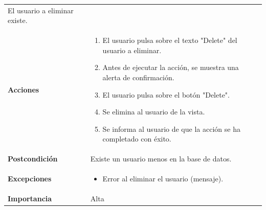 \documentclass[
]{article}
\providecommand{\tightlist}{%
  \setlength{\itemsep}{0pt}\setlength{\parskip}{0pt}}
\begin{document}
\begin{longtable}[]{@{}ll@{}}
\begin{minipage}[t]{0.68\columnwidth}
El usuario a eliminar existe.\strut
\end{minipage}\tabularnewline
\begin{minipage}[t]{0.26\columnwidth}\raggedright
\textbf{Acciones}\strut
\end{minipage} & \begin{minipage}[t]{0.68\columnwidth}\raggedright
\begin{enumerate}
\def\labelenumi{\arabic{enumi}.}
\tightlist
\item
  El usuario pulsa sobre el texto "Delete" del usuario a eliminar.
\item
  Antes de ejecutar la acción, se muestra una alerta de confirmación.
\item
  El usuario pulsa sobre el botón "Delete".
\item
  Se elimina al usuario de la vista.
\item
  Se informa al usuario de que la acción se ha completado con éxito.
\end{enumerate}\strut
\end{minipage}\tabularnewline
\begin{minipage}[t]{0.26\columnwidth}\raggedright
\textbf{Postcondición}\strut
\end{minipage} & \begin{minipage}[t]{0.68\columnwidth}\raggedright
Existe un usuario menos en la base de datos.\strut
\end{minipage}\tabularnewline
\begin{minipage}[t]{0.26\columnwidth}\raggedright
\textbf{Excepciones}\strut
\end{minipage} & \begin{minipage}[t]{0.68\columnwidth}\raggedright
\begin{itemize}
\tightlist
\item
  Error al eliminar el usuario (mensaje).
\end{itemize}\strut
\end{minipage}\tabularnewline
\begin{minipage}[t]{0.26\columnwidth}\raggedright
\textbf{Importancia}\strut
\end{minipage} & \begin{minipage}[t]{0.68\columnwidth}\raggedright
Alta\strut
\end{minipage}\tabularnewline
\bottomrule
\end{longtable}
\end{document}
